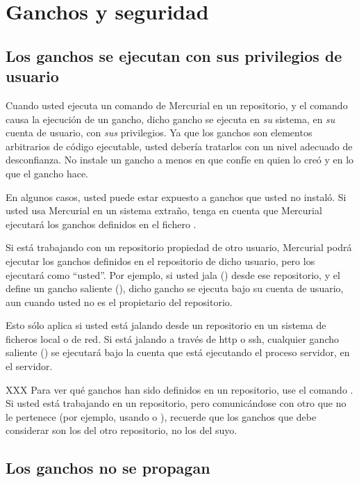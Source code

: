\section{Ganchos y seguridad}

\subsection{Los ganchos se ejecutan con sus privilegios de usuario}

Cuando usted ejecuta un comando de Mercurial en un repositorio, y el
comando causa la ejecución de un gancho, dicho gancho se ejecuta en
\emph{su} sistema, en \emph{su} cuenta de usuario, con \emph{sus}
privilegios. Ya que los ganchos son elementos arbitrarios de código
ejecutable, usted debería tratarlos con un nivel adecuado de
desconfianza. No instale un gancho a menos en que confíe en quien lo
creó y en lo que el gancho hace.

En algunos casos, usted puede estar expuesto a ganchos que usted no
instaló. Si usted usa Mercurial en un sistema extraño, tenga en cuenta
que Mercurial ejecutará los ganchos definidos en el fichero \hgrc.

Si está trabajando con un repositorio propiedad de otro usuario,
Mercurial podrá ejecutar los ganchos definidos en el repositorio de
dicho usuario, pero los ejecutará como ``usted''. Por ejemplo, si
usted jala () desde ese repositorio, y el
 define un gancho saliente (),
dicho gancho se ejecuta bajo su cuenta de usuario, aun cuando usted no
es el propietario del repositorio.

\begin{note}
  Esto sólo aplica si usted está jalando desde un repositorio en un
  sistema de ficheros local o de red. Si está jalando a través de http
  o ssh, cualquier gancho saliente () se ejecutará bajo
  la cuenta que está ejecutando el proceso servidor, en el servidor.
\end{note}

XXX Para ver qué ganchos han sido definidos en un repositorio, use el
comando . Si usted está trabajando en un
repositorio, pero comunicándose con otro que no le pertenece
(por ejemplo, usando  o ), recuerde que
los ganchos que debe considerar son los del otro repositorio, no los
del suyo.

\subsection{Los ganchos no se propagan}

